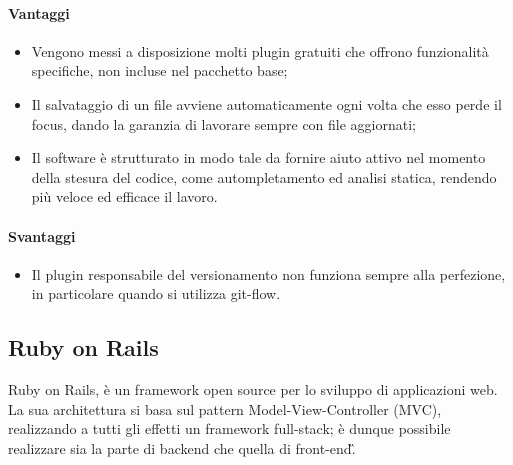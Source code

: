 \paragraph{Vantaggi}
\begin{itemize}
	\item Vengono messi a disposizione molti plugin gratuiti che offrono funzionalità specifiche, non incluse nel pacchetto base;
	\item Il salvataggio di un file avviene automaticamente ogni volta che esso perde il focus, dando la garanzia di lavorare sempre con file aggiornati;
	\item Il software è strutturato in modo tale da fornire aiuto attivo nel momento della stesura del codice, come autompletamento ed analisi statica, rendendo più veloce ed efficace il lavoro.
\end{itemize}
\paragraph{Svantaggi}
\begin{itemize}
	\item Il plugin responsabile del versionamento non funziona sempre alla perfezione, in particolare quando si utilizza git-flow.
\end{itemize}

\subsection{Ruby on Rails}

Ruby on Rails, è un framework open source per lo sviluppo di applicazioni web.
La sua architettura si basa sul pattern Model-View-Controller (MVC), realizzando a tutti gli effetti un framework full-stack; è dunque possibile realizzare sia la parte di backend che quella di \gls{front-end}\G.
